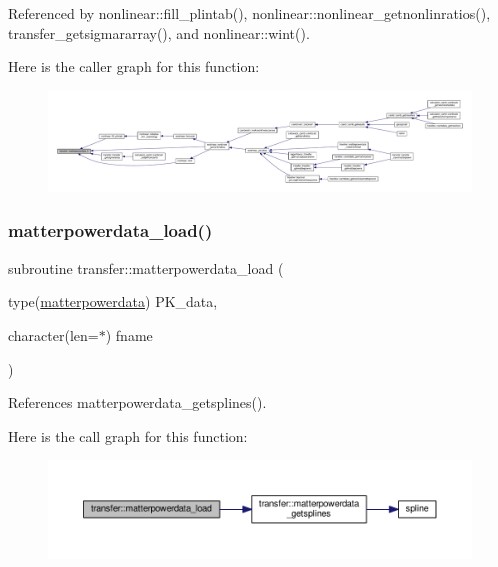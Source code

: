 Referenced by nonlinear\+::fill\+\_\+plintab(), nonlinear\+::nonlinear\+\_\+getnonlinratios(), transfer\+\_\+getsigmararray(), and nonlinear\+::wint().

Here is the caller graph for this function\+:
\nopagebreak
\begin{figure}[H]
\begin{center}
\leavevmode
\includegraphics[width=350pt]{namespacetransfer_a7d7e2b6a55941b8e40b01b2cfed0af02_icgraph}
\end{center}
\end{figure}
\mbox{\label{namespacetransfer_af9f31cacfbd0270f60f1c42a0b38dd62}} 
\subsubsection{\texorpdfstring{matterpowerdata\+\_\+load()}{matterpowerdata\_load()}}
{\footnotesize\ttfamily subroutine transfer\+::matterpowerdata\+\_\+load (\begin{DoxyParamCaption}\item[{type(\mbox{\hyperlink{structtransfer_1_1matterpowerdata}{matterpowerdata}})}]{P\+K\+\_\+data,  }\item[{character(len=$\ast$)}]{fname }\end{DoxyParamCaption})}



References matterpowerdata\+\_\+getsplines().

Here is the call graph for this function\+:
\nopagebreak
\begin{figure}[H]
\begin{center}
\leavevmode
\includegraphics[width=350pt]{namespacetransfer_af9f31cacfbd0270f60f1c42a0b38dd62_cgraph}
\end{center}
\end{figure}
\mbox{\label{namespacetransfer_a113eb04b73dbf4222ca5a7e88eea5528}} 
